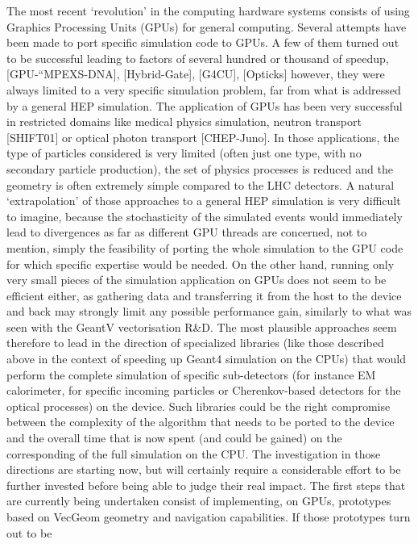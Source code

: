 \documentclass[10pt,a4paper]{article}
\begin{document}
The most recent `revolution' in the computing hardware systems consists
of using Graphics Processing Units (GPUs) for general computing. Several
attempts have been made to port specific simulation code to GPUs. A few
of them turned out to be successful leading to factors of several
hundred or thousand of speedup, {[}GPU-``MPEXS-DNA{]},
{[}Hybrid-Gate{]}, {[}G4CU{]}, {[}Opticks{]} however, they were always
limited to a very specific simulation problem, far from what is
addressed by a general HEP simulation. The application of GPUs has been
very successful in restricted domains like medical physics simulation,
neutron transport {[}SHIFT01{]} or optical photon transport
{[}CHEP-Juno{]}. In those applications, the type of particles considered
is very limited (often just one type, with no secondary particle
production), the set of physics processes is reduced and the geometry is
often extremely simple compared to the LHC detectors. A natural
`extrapolation' of those approaches to a general HEP simulation is very
difficult to imagine, because the stochasticity of the simulated events
would immediately lead to divergences as far as different GPU threads
are concerned, not to mention, simply the feasibility of porting the
whole simulation to the GPU code for which specific expertise would be
needed. On the other hand, running only very small pieces of the
simulation application on GPUs does not seem to be efficient either, as
gathering data and transferring it from the host to the device and back
may strongly limit any possible performance gain, similarly to what was
seen with the GeantV vectorisation R\&D. The most plausible approaches
seem therefore to lead in the direction of specialized libraries (like
those described above in the context of speeding up Geant4 simulation on
the CPUs) that would perform the complete simulation of specific
sub-detectors (for instance EM calorimeter, for specific incoming
particles or Cherenkov-based detectors for the optical processes) on the
device. Such libraries could be the right compromise between the
complexity of the algorithm that needs to be ported to the device and
the overall time that is now spent (and could be gained) on the
corresponding of the full simulation on the CPU. The investigation in
those directions are starting now, but will certainly require a
considerable effort to be further invested before being able to judge
their real impact. The first steps that are currently being undertaken
consist of implementing, on GPUs, prototypes based on VecGeom geometry
and navigation capabilities. If those prototypes turn out to be
\end{document}
